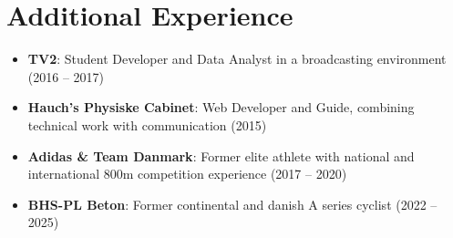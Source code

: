 \documentclass[a4paper,10pt]{article}
\newcommand{\resumeSkill}[2]{
  \item\small{\textbf{#1}: #2 \vspace{-2pt}}
}
\begin{document}
\section{Additional Experience}
\begin{itemize}[leftmargin=0in, label={}]
  \resumeSkill{TV2}{Student Developer and Data Analyst in a broadcasting environment (2016 -- 2017)}
  \resumeSkill{Hauch's Physiske Cabinet}{Web Developer and Guide, combining technical work with communication (2015)}
  \resumeSkill{Adidas \& Team Danmark}{Former elite athlete with national and international 800m competition experience (2017 -- 2020)}
  \resumeSkill{BHS-PL Beton}{Former continental and danish A series cyclist (2022 -- 2025)}
\end{itemize}

\end{document}
